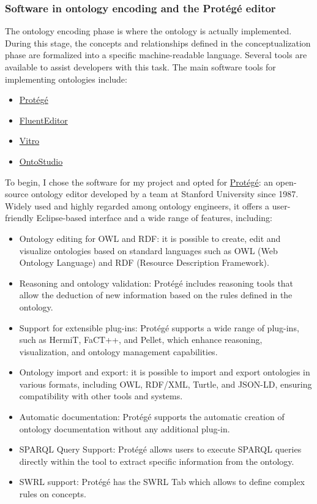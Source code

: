 \subsubsection{Software in ontology encoding and the Protégé editor}
The ontology encoding phase is where the ontology is actually implemented. During this stage, the concepts and relationships defined in the conceptualization phase are formalized into a specific machine-readable language. Several tools are available to assist developers with this task. The main software tools for implementing ontologies include:
\begin{itemize}
    \item \href{https://protege.stanford.edu/}{Protégé}
    \item \href{https://www.cognitum.eu/semantics/fluenteditor/}{FluentEditor}
    \item \href{https://github.com/vivo-project/Vitro?tab=readme-ov-file}{Vitro}
    \item \href{https://www.semafora-systems.com/ontobroker-and-ontostudio-x}{OntoStudio}
\end{itemize}
To begin, I chose the software for my project and opted for \href{https://protege.stanford.edu/}{Protégé}: an open-source ontology editor developed by a team at Stanford University since 1987. Widely used and highly regarded among ontology engineers, it offers a user-friendly Eclipse-based interface and a wide range of features, including:
\begin{itemize}
    \item Ontology editing for OWL and RDF: it is possible to create, edit and visualize ontologies based on standard languages such as OWL (Web Ontology Language) and RDF (Resource Description Framework). 
    
    \item Reasoning and ontology validation: Protégé includes reasoning tools that allow the deduction of new information based on the rules defined in the ontology.

    \item Support for extensible plug-ins: Protégé supports a wide range of plug-ins, such as HermiT, FaCT++, and Pellet, which enhance reasoning, visualization, and ontology management capabilities.

    \item Ontology import and export: it is possible to import and export ontologies in various formats, including OWL, RDF/XML, Turtle, and JSON-LD, ensuring  compatibility with other tools and systems.

    \item Automatic documentation: Protégé supports the automatic creation of ontology documentation without any additional plug-in.

    \item SPARQL Query Support: Protégé allows users to execute SPARQL queries directly within the tool to extract specific information from the ontology.

    \item SWRL support: Protégé has the SWRL Tab which allows to define complex rules on concepts.
\end{itemize}
